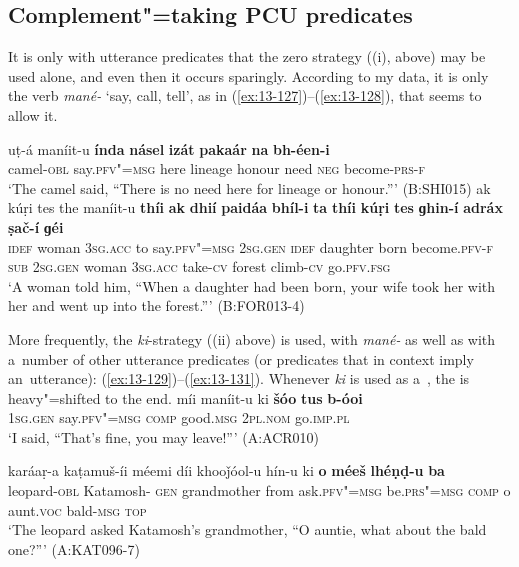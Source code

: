 \subsection{Complement"=taking {PCU} predicates}
\label{subsec:13-5-1}

 It is only with utterance predicates that the zero strategy ((i), above) may be used alone, and even then it occurs sparingly. According to my data, it is only the verb \textit{mané-} `say, call, tell', as in (\ref{ex:13-127})--(\ref{ex:13-128}), that seems to allow it.

\ea
\label{ex:13-127}
\gll uṭ-á maníit-u \textbf{índa} \textbf{násel} \textbf{izát} \textbf{pakaár} \textbf{na} \textbf{bh-éen-i}\\
camel-\textsc{obl} say.\textsc{pfv"=msg} here lineage honour need \textsc{neg} become-\textsc{prs-f}\\
\glt `The camel said, ``There is no need here for lineage or honour.''' (B:SHI015)
\ex
\label{ex:13-128}
\gll ak kúṛi tes the maníit-u \textbf{thíi} \textbf{ak} \textbf{dhií} \textbf{paidáa} \textbf{bhíl-i} \textbf{ta} \textbf{thíi} \textbf{kúṛi} \textbf{tes} \textbf{ɡhin-í} \textbf{adráx} \textbf{ṣač-í} \textbf{ɡéi}\\
\textsc{idef} woman \textsc{3sg.acc} to say.\textsc{pfv"=msg} \textsc{2sg.gen} \textsc{idef} daughter born become.\textsc{pfv-f} \textsc{sub} \textsc{2sg.gen} woman \textsc{3sg.acc} take-\textsc{cv} forest climb-\textsc{cv} go.\textsc{pfv.fsg}\\
\glt `A woman told him, ``When a daughter had been born, your wife took her with her and went up into the forest.''' (B:FOR013-4) 
\z

More frequently, the \textit{ki}-strategy ((ii) above) is used, with \textit{mané-} as well as with a~number of other utterance predicates (or predicates that in context imply an~utterance): (\ref{ex:13-129})--(\ref{ex:13-131}). Whenever \textit{ki} is used as a~, the  is heavy"=shifted to the end.
\largerpage
\ea
\label{ex:13-129}
\gll míi maníit-u ki \textbf{šóo} \textbf{tus} \textbf{b-óoi}  \\
\textsc{1sg.gen} say.\textsc{pfv"=msg} \textsc{comp} good.\textsc{msg} \textsc{2pl.nom} go.\textsc{imp.pl} \\
\glt `I said, ``That's fine, you may leave!''' (A:ACR010)

\ex
\label{ex:13-130}
\gll karáaṛ-a kaṭamuš-íi méemi díi khooǰóol-u hín-u ki \textbf{o} \textbf{méeš} \textbf{lhéṇḍ-u} \textbf{ba}\\
leopard-\textsc{obl} Katamosh-\textsc{ gen} grandmother from ask.\textsc{pfv"=msg} be.\textsc{prs"=msg} \textsc{comp} o aunt.\textsc{voc} bald-\textsc{msg} \textsc{top}\\
\glt `The leopard asked Katamosh's grandmother, ``O auntie, what about the bald one?''' (A:KAT096-7)

